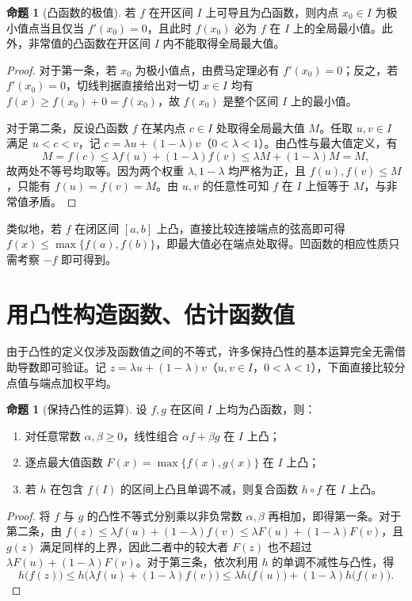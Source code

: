 \documentclass[UTF8,fontset=fandol,a4paper,12pt]{ctexart}
\theoremstyle{definition}
\newtheorem{proposition}[theorem]{命题}
\begin{document}
\begin{proposition}[凸函数的极值]
若 $f$ 在开区间 $I$ 上可导且为凸函数，则内点 $x_0\in I$ 为极小值点当且仅当 $f'(x_0)=0$，且此时 $f(x_0)$ 必为 $f$ 在 $I$ 上的全局最小值。此外，非常值的凸函数在开区间 $I$ 内不能取得全局最大值。
\end{proposition}

\begin{proof}
对于第一条，若 $x_0$ 为极小值点，由费马定理必有 $f'(x_0)=0$；反之，若 $f'(x_0)=0$，切线判据直接给出对一切 $x\in I$ 均有 $f(x)\ge f(x_0)+0=f(x_0)$，故 $f(x_0)$ 是整个区间 $I$ 上的最小值。

对于第二条，反设凸函数 $f$ 在某内点 $c\in I$ 处取得全局最大值 $M$。任取 $u,v\in I$ 满足 $u<c<v$，记 $c=\lambda u+(1-\lambda)v$（$0<\lambda<1$）。由凸性与最大值定义，有
\[
 M=f(c)\le\lambda f(u)+(1-\lambda)f(v)\le\lambda M+(1-\lambda)M=M,
\]
故两处不等号均取等。因为两个权重 $\lambda,1-\lambda$ 均严格为正，且 $f(u),f(v)\le M$，只能有 $f(u)=f(v)=M$。由 $u,v$ 的任意性可知 $f$ 在 $I$ 上恒等于 $M$，与非常值矛盾。
\end{proof}

类似地，若 $f$ 在闭区间 $[a,b]$ 上凸，直接比较连接端点的弦高即可得 $f(x)\le\max\{f(a),f(b)\}$，即最大值必在端点处取得。凹函数的相应性质只需考察 $-f$ 即可得到。

\section{用凸性构造函数、估计函数值}
由于凸性的定义仅涉及函数值之间的不等式，许多保持凸性的基本运算完全无需借助导数即可验证。记 $z=\lambda u+(1-\lambda)v$（$u,v\in I$，$0<\lambda<1$），下面直接比较分点值与端点加权平均。

\begin{proposition}[保持凸性的运算]
设 $f,g$ 在区间 $I$ 上均为凸函数，则：
\begin{enumerate}
\item 对任意常数 $\alpha,\beta\ge0$，线性组合 $\alpha f+\beta g$ 在 $I$ 上凸；
\item 逐点最大值函数 $F(x)=\max\{f(x),g(x)\}$ 在 $I$ 上凸；
\item 若 $h$ 在包含 $f(I)$ 的区间上凸且单调不减，则复合函数 $h\circ f$ 在 $I$ 上凸。
\end{enumerate}
\end{proposition}

\begin{proof}
将 $f$ 与 $g$ 的凸性不等式分别乘以非负常数 $\alpha,\beta$ 再相加，即得第一条。对于第二条，由 $f(z)\le\lambda f(u)+(1-\lambda)f(v)\le\lambda F(u)+(1-\lambda)F(v)$，且 $g(z)$ 满足同样的上界，因此二者中的较大者 $F(z)$ 也不超过 $\lambda F(u)+(1-\lambda)F(v)$。对于第三条，依次利用 $h$ 的单调不减性与凸性，得
\[
 h\bigl(f(z)\bigr)\le h\bigl(\lambda f(u)+(1-\lambda)f(v)\bigr)
 \le\lambda h\bigl(f(u)\bigr)+(1-\lambda)h\bigl(f(v)\bigr).
\]
\end{proof}
\end{document}
